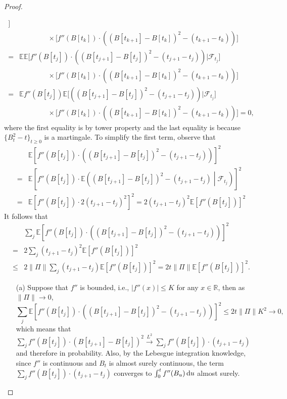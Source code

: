 \begin{proof}
\begin{itemize}
\begin{align*}
\bigg]\\&\qquad\qquad\times\bigg[
f''(B[t_{k}])\cdot\left((B[t_{k+1}] - B[t_{k}])^2
-(t_{k+1}-t_{k})\right)
\bigg]\\
=&\mathbb{E}\mathbb{E}\bigg[
f''(B[t_{j}])\cdot\left((B[t_{j+1}] - B[t_{j}])^2
-(t_{j+1}-t_{j})\right)\bigg|\mathcal{F}_{t_j}
\bigg]\\&\qquad\qquad\times\bigg[
f''(B[t_{k}])\cdot\left((B[t_{k+1}] - B[t_{k}])^2
-(t_{k+1}-t_{k})\right)
\bigg]\\
=&\mathbb{E}f''(B[t_{j}])\mathbb{E}\bigg[
\left((B[t_{j+1}] - B[t_{j}])^2
-(t_{j+1}-t_{j})\right)\bigg|\mathcal{F}_{t_j}
\bigg]\\&\qquad\qquad\times\bigg[
f''(B[t_{k}])\cdot\left((B[t_{k+1}] - B[t_{k}])^2
-(t_{k+1}-t_{k})\right)
\bigg]=0,
\end{align*}
where the first equality is by tower property and the last equality is because $\{B_t^2-t\}_{t\ge0}$ is a martingale.
To simplify the first term, observe that 
\begin{align*}
&\mathbb{E}\left[
f''(B[t_{j}])\cdot\left((B[t_{j+1}] - B[t_{j}])^2
-(t_{j+1}-t_{j})\right)
\right]^2\\
=&\mathbb{E}\left[
f''(B[t_{j}])\cdot\mathbb{E}\left((B[t_{j+1}] - B[t_{j}])^2
-(t_{j+1}-t_{j})\middle|\mathcal{F}_{t_j}\right)
\right]^2\\
=&\mathbb{E}\left[
f''(B[t_{j}])\cdot2(t_{j+1} - t_j)^2
\right]^2=2(t_{j+1} - t_j)^2\mathbb{E}\left[
f''(B[t_{j}])\right]^2
\end{align*}
It follows that
\begin{align*}
&\sum_j\mathbb{E}\left[
f''(B[t_{j}])\cdot\left((B[t_{j+1}] - B[t_{j}])^2
-(t_{j+1}-t_{j})\right)
\right]^2\\
=&2\sum_j(t_{j+1} - t_j)^2\mathbb{E}\left[
f''(B[t_{j}])\right]^2\\
\le&2\|\Pi\|\sum_j(t_{j+1} - t_j)\mathbb{E}\left[
f''(B[t_{j}])\right]^2=2t\|\Pi\|\mathbb{E}\left[
f''(B[t_{j}])\right]^2.
\end{align*}
\begin{itemize}
\item[(a)]
Suppose that $f''$ is bounded, i.e., $|f''(x)|\le K$ for any $x\in\mathbb{R}$, then as $\|\Pi\|\to0$,
\[
\sum_j\mathbb{E}\left[
f''(B[t_{j}])\cdot\left((B[t_{j+1}] - B[t_{j}])^2
-(t_{j+1}-t_{j})\right)
\right]^2\le 2t\|\Pi\|K^2\to0,
\]
which means that $\sum_jf''(B[t_{j}])\cdot(B[t_{j+1}] - B[t_{j}])^2
\xrightarrow{L^2}
\sum_jf''(B[t_{j}])\cdot(t_{j+1}-t_{j})$ and therefore in probability.
Also, by the Lebesgue integration knowledge, since $f''$ is continuous and $B_t$ is almost surely continuous, the term $\sum_jf''(B[t_{j}])\cdot(t_{j+1}-t_{j})$ converges to $\int_0^tf''(B_u)\,\mathrm{d} u$ almost surely.

\end{itemize}
\end{itemize}
\end{proof}

